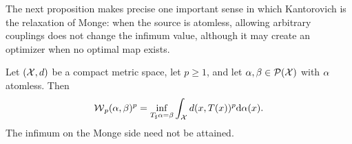 The next proposition makes precise one important sense in which Kantorovich is the relaxation of Monge: when the source is atomless, allowing arbitrary couplings does not change the infimum value, although it may create an optimizer when no optimal map exists.

\begin{prop}\label{prop-kantorovich-relaxation-monge}
	Let $(\mathcal{X},d)$ be a compact metric space, let $p\geq1$, and let $\alpha,\beta\in\mathcal{P}(\mathcal{X})$ with $\alpha$ atomless. Then
	\[
		\operatorname{\mathcal{W}}_p(\alpha,\beta)^p
		=
		\inf_{T_\sharp\alpha=\beta}\int_{\mathcal{X}} d(x,T(x))^p\mathrm{d}\alpha(x).
	\]
	The infimum on the Monge side need not be attained.
\end{prop}

